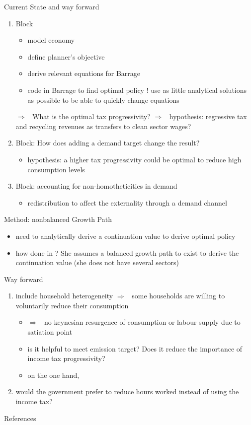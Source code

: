 \documentclass[11pt,aspectratio=169]{beamer}
\newcommand{\ar}{$\Rightarrow$ \ }
\begin{document}
\begin{frame}{Current State and way forward}
	\begin{enumerate}
		\item Block
		\begin{itemize}
			\item model economy \checkmark
			\item define planner's objective
			\item derive relevant equations for Barrage
			\item code in Barrage to find optimal policy ! use as little analytical solutions as possible to be able to quickly change equations
		\end{itemize}
		\ar What is the optimal tax progressivity? \ar hypothesis: regressive tax and recycling revenues as transfers to clean sector wages?
		\item Block: How does adding a demand target change the result?
		\begin{itemize}
			\item hypothesis: a higher tax progressivity could be optimal to reduce high consumption levels
		\end{itemize}
	\item Block: accounting for non-homotheticities in demand
	\begin{itemize}
		\item redistribution to affect the externality through a demand channel
	\end{itemize}
	\end{enumerate}
\end{frame}

\begin{frame}{Method: nonbalanced Growth Path}
	\begin{itemize}
		\item need to analytically derive a continuation value to derive optimal policy
		\item how done in \cite{Barrage2019OptimalPolicy}? She assumes a balanced growth path to exist to derive the continuation value (she does not have several sectors)
	\end{itemize}
\end{frame}

\begin{frame}{Way forward}
\begin{enumerate}
	\item include household heterogeneity \ar some households are willing to voluntarily reduce their consumption
	\begin{itemize}
		\item \ar no keynesian resurgence of consumption or labour supply due to satiation point
		\item is it helpful to meet emission target? Does it reduce the importance of income tax progressivity?
		\item on the one hand, 
	\end{itemize}
\item would the government prefer to reduce hours worked instead of using the income tax?
\end{enumerate}
\end{frame}


\begin{frame}[shrink]{References}
	
	
	
\end{frame}
\end{document}
